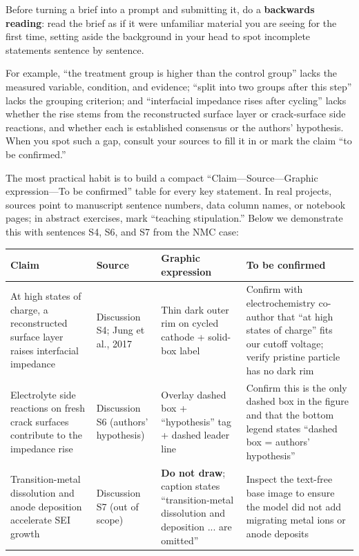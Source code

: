 Before turning a brief into a prompt and submitting it, do a \textbf{backwards reading}: read the brief as if it were unfamiliar material you are seeing for the first time, setting aside the background in your head to spot incomplete statements sentence by sentence.

For example, ``the treatment group is higher than the control group'' lacks the measured variable, condition, and evidence; ``split into two groups after this step'' lacks the grouping criterion; and ``interfacial impedance rises after cycling'' lacks whether the rise stems from the reconstructed surface layer or crack-surface side reactions, and whether each is established consensus or the authors' hypothesis. When you spot such a gap, consult your sources to fill it in or mark the claim ``to be confirmed.''

The most practical habit is to build a compact ``Claim---Source---Graphic expression---To be confirmed'' table for every key statement. In real projects, sources point to manuscript sentence numbers, data column names, or notebook pages; in abstract exercises, mark ``teaching stipulation.'' Below we demonstrate this with sentences S4, S6, and S7 from the NMC case:

\begin{center}\small
\begin{tabularx}{\linewidth}{@{}>{\raggedright\arraybackslash}p{30mm}>{\raggedright\arraybackslash}p{24mm}YY@{}}
\toprule
\textbf{Claim} & \textbf{Source} & \textbf{Graphic expression} & \textbf{To be confirmed} \\
\midrule
At high states of charge, a reconstructed surface layer raises interfacial impedance & Discussion S4; Jung et al., 2017 & Thin dark outer rim on cycled cathode + solid-box label & Confirm with electrochemistry co-author that ``at high states of charge'' fits our cutoff voltage; verify pristine particle has no dark rim \\
Electrolyte side reactions on fresh crack surfaces contribute to the impedance rise & Discussion S6 (authors' hypothesis) & Overlay dashed box + ``hypothesis'' tag + dashed leader line & Confirm this is the only dashed box in the figure and that the bottom legend states ``dashed box = authors' hypothesis'' \\
Transition-metal dissolution and anode deposition accelerate SEI growth & Discussion S7 (out of scope) & \textbf{Do not draw}; caption states ``transition-metal dissolution and deposition ... are omitted'' & Inspect the text-free base image to ensure the model did not add migrating metal ions or anode deposits \\
\bottomrule
\end{tabularx}
\end{center}

